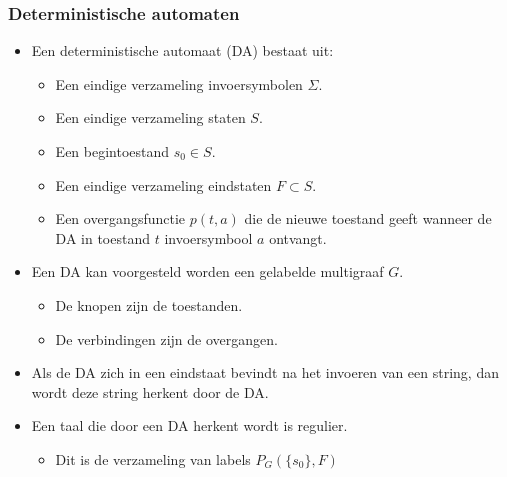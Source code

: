 \subsubsection{Deterministische automaten}    
\begin{itemize}
     \item Een deterministische automaat (DA) bestaat uit: 
    \begin{itemize}
        \item Een eindige verzameling invoersymbolen $\Sigma$.
        \item Een eindige verzameling staten $S$.
        \item Een begintoestand $s_0 \in S$.
        \item Een eindige verzameling eindstaten $F \subset S$.
        \item Een overgangsfunctie $p(t, a)$ die de nieuwe toestand geeft wanneer de DA in toestand $t$ invoersymbool $a$ ontvangt.
    \end{itemize}
    \item Een DA kan voorgesteld worden een gelabelde multigraaf $G$.
    \begin{itemize}
        \item De knopen zijn de toestanden.
        \item De verbindingen zijn de overgangen.
    \end{itemize}
    \item Als de DA zich in een eindstaat bevindt na het invoeren van een string, dan wordt deze string herkent door de DA.
    \item Een taal die door een DA herkent wordt is regulier.
    \begin{itemize}
        \item Dit is de verzameling van labels $P_G(\{s_0\}, F)$
    \end{itemize}
\end{itemize}
